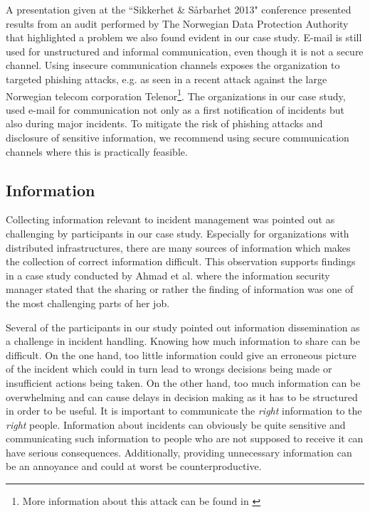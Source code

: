 A presentation given at the ``Sikkerhet \& S\aa rbarhet 2013" conference presented results from an audit performed by The Norwegian Data Protection Authority that highlighted a problem we also found evident in our case study. E-mail is still used for unstructured and informal communication, even though it is not a secure channel. Using insecure communication channels exposes the organization to targeted phishing attacks, e.g. as seen in a recent attack against the large Norwegian telecom corporation Telenor\footnote{More information about this attack can be found in \cite{phisingattack}}. The organizations in our case study, used e-mail for communication not only as a first notification of incidents but also during major incidents. To mitigate the risk of phishing attacks and disclosure of sensitive information, we recommend using secure communication channels where this is practically feasible. 


\subsection{Information}
Collecting information relevant to incident management was pointed out as challenging by participants in our case study. Especially for organizations with distributed infrastructures, there are many sources of information which makes the collection of correct information difficult. This observation supports findings in a case study conducted by Ahmad et al.\cite{ahmad2012incident} where the information security manager stated that the sharing or rather the finding of information was one of the most challenging parts of her job. 

Several of the participants in our study pointed out information dissemination as a challenge in incident handling. Knowing how much information to share can be difficult. On the one hand, too little information could give an erroneous picture of the incident which could in turn lead to wrongs decisions being made or insufficient actions being taken. On the other hand, too much information can be overwhelming and can cause delays in decision making as it has to be structured in order to be useful. It is important to communicate the \textit{right} information to the \textit{right} people. Information about incidents can obviously be quite sensitive and communicating such information to people who are not supposed to receive it can have serious consequences. Additionally, providing unnecessary information can be an annoyance and could at worst be counterproductive.

